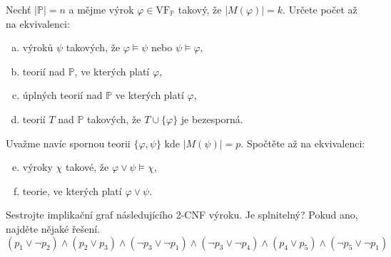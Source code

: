 \documentclass[a4paper,11pt]{amsart}
\begin{document}
\begin{problem}

    Nechť $|\mathbb{P}|=n$ a mějme výrok $\varphi\in\mathrm{VF}_{\mathbb{P}}$ takový, že $|M(\varphi)|=k$. Určete počet až na ekvivalenci:
    \begin{enumerate}[(a)]
        \item výroků $\psi$ takových, že $\varphi \models \psi$ nebo $\psi \models \varphi$,
        \item teorií nad $\mathbb{P}$, ve kterých platí $\varphi$,
        \item úplných teorií nad $\mathbb{P}$ ve kterých platí $\varphi$,
        \item teorií $T$ nad $\mathbb{P}$ takových, že $T \cup \{\varphi\}$ je bezesporná.
    \end{enumerate}
    Uvažme navíc spornou teorii $\{\varphi,\psi\}$ kde $|M(\psi)|=p$. Spočtěte až na ekvivalenci:
    \begin{enumerate}[(a)]\setcounter{enumi}{4}
        \item výroky $\chi$ takové, že $\varphi \vee \psi \models \chi$, 
        \item teorie, ve kterých platí $\varphi \vee \psi$.
    \end{enumerate}

    \begin{solution}
                
    \end{solution}
    
\end{problem}


\begin{problem} \label{problem:2sat}
    
    Sestrojte implikační graf následujícího 2-CNF výroku. Je splnitelný? Pokud ano, najděte nějaké řešení.
    $$
    (p_1\vee \neg p_2)\wedge (p_2\vee p_3)\wedge (\neg p_3\vee \neg p_1)\wedge (\neg p_3\vee \neg p_4)\wedge (p_4\vee p_5)\wedge (\neg p_5\vee \neg p_1)
    $$

    \begin{solution}
                
    \end{solution}


\end{problem}
\end{document}
